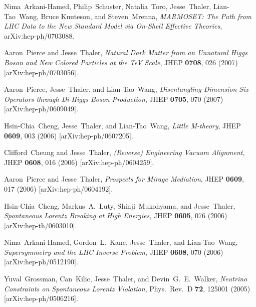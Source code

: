 \documentclass[11pt]{article}
\renewcommand{\bibitem}[1]{\item}
\begin{document}
\begin{list}{[]\addtocounter{jessecount}{-1}}{\leftmargin=3em \itemsep=4pt}
\bibitem{ArkaniHamed:2007fw}
  Nima~Arkani-Hamed, Philip~Schuster, Natalia~Toro, Jesse~Thaler, Lian-Tao~Wang, Bruce Knuteson, and Steven~Mrenna,
  \emph{MARMOSET: The Path from LHC Data to the New Standard Model via On-Shell Effective Theories},
  arXiv:hep-ph/0703088.
  
\bibitem{Pierce:2007ut}
  Aaron~Pierce and Jesse~Thaler,
  \emph{Natural Dark Matter from an Unnatural Higgs Boson and New Colored Particles at the TeV Scale},
  JHEP {\bf 0708}, 026 (2007)
  [arXiv:hep-ph/0703056].
  
\bibitem{Pierce:2006dh}
  Aaron~Pierce, Jesse~Thaler, and Lian-Tao~Wang,
  \emph{Disentangling Dimension Six Operators through Di-Higgs Boson Production},
  JHEP {\bf 0705}, 070 (2007)
  [arXiv:hep-ph/0609049].
  
\bibitem{Cheng:2006ht}
  Hsin-Chia~Cheng, Jesse~Thaler, and Lian-Tao~Wang,
  \emph{Little M-theory},
  JHEP {\bf 0609}, 003 (2006)
  [arXiv:hep-ph/0607205].
  
\bibitem{Cheung:2006ij}
  Clifford~Cheung and Jesse~Thaler,
  \emph{(Reverse) Engineering Vacuum Alignment},
  JHEP {\bf 0608}, 016 (2006)
  [arXiv:hep-ph/0604259].
  
\bibitem{Pierce:2006cf}
  Aaron~Pierce and Jesse~Thaler,
  \emph{Prospects for Mirage Mediation},
  JHEP {\bf 0609}, 017 (2006)
  [arXiv:hep-ph/0604192].
  
\bibitem{Cheng:2006us}
  Hsin-Chia~Cheng, Markus~A.~Luty, Shinji~Mukohyama, and Jesse~Thaler,
  \emph{Spontaneous Lorentz Breaking at High Energies},
  JHEP {\bf 0605}, 076 (2006)
  [arXiv:hep-th/0603010].
  
\bibitem{ArkaniHamed:2005px}
  Nima~Arkani-Hamed, Gordon~L.~Kane, Jesse~Thaler, and Lian-Tao~Wang,
  \emph{Supersymmetry and the LHC Inverse Problem},
  JHEP {\bf 0608}, 070 (2006)
  [arXiv:hep-ph/0512190].
  
\bibitem{Grossman:2005ej}
  Yuval~Grossman, Can~Kilic, Jesse~Thaler, and Devin~G.~E.~Walker,
  \emph{Neutrino Constraints on Spontaneous Lorentz Violation},
  Phys.\ Rev.\  D {\bf 72}, 125001 (2005)
  [arXiv:hep-ph/0506216].
  

\end{list}
\end{document}
